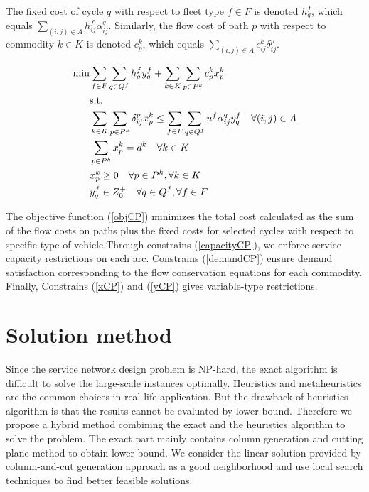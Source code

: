 \documentclass[11pt,nonblindrev,fleqn]{article}
\begin{document}
The fixed cost of cycle $q$ with respect to fleet type $f\in F$ is denoted $h_q^f$, which equals $\sum_{(i,j)\in A} h_{ij}^f \alpha_{ij}^q$. Similarly, the flow cost of path $p$ with respect to commodity $k\in K$ is denoted $c_p^k$, which equals $\sum_{(i,j)\in A} c_{ij}^k \delta_{ij}^p$.

\begin{align}
  \min &    \sum_{f\in F}\sum_{q\in Q^f}h_q^f y_q^f  +   \sum_{k\in K}\sum_{p\in P^k}c_p^k x_p^k  \label{objCP}    \\
         & \rm{s.t.} \nonumber \\
         &     \sum_{k\in K}\sum_{p\in P^k}\delta_{ij}^p x_p^k \leq  \sum_{f\in F}\sum_{q\in Q^f}u^f \alpha_{ij}^q y_q^f      \quad \forall (i,j)\in A \label{capacityCP}\\
         &     \sum_{p\in P^k}x_p^k = d^k      \quad       \forall k\in K  \label{demandCP}    \\
         &      x_p^k \geq 0        \quad       \forall p\in P^k,\forall k\in K     \label{xCP} \\
         &      y_q^f \in Z_0^+     \quad       \forall q\in Q^f, \forall f\in F    \label{yCP}
\end{align}

The objective function (\ref{objCP}) minimizes the total cost calculated as the sum of the flow costs on paths plus the fixed costs for selected cycles with respect to specific type of vehicle.Through constrains (\ref{capacityCP}), we enforce service capacity restrictions on each arc. Constrains (\ref{demandCP}) ensure demand satisfaction corresponding to the flow conservation equations for each commodity. Finally, Constrains (\ref{xCP}) and (\ref{yCP}) gives variable-type restrictions.

\section{Solution method}
Since the service network design problem is NP-hard, the exact algorithm is difficult to solve the large-scale instances optimally. Heuristics and metaheuristics are the common choices in real-life application. But the drawback of heuristics algorithm is that the results cannot be evaluated by lower bound. Therefore we propose a hybrid method combining the exact and the heuristics algorithm to solve the problem. The exact part mainly contains column generation and cutting plane method to obtain lower bound. We consider the linear solution provided by column-and-cut generation approach as a good neighborhood and use local search techniques to find better feasible solutions.
\end{document}
